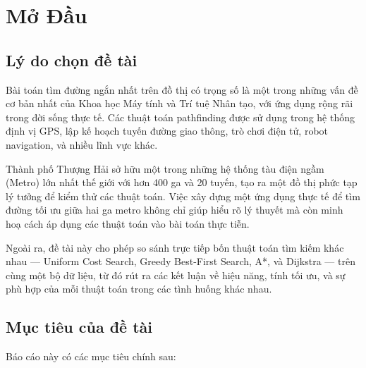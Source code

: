 
\chapter{Mở Đầu}

\section{Lý do chọn đề tài}

Bài toán tìm đường ngắn nhất trên đồ thị có trọng số là một trong những vấn đề cơ bản nhất của Khoa học Máy tính và Trí tuệ Nhân tạo, với ứng dụng rộng rãi trong đời sống thực tế. Các thuật toán pathfinding được sử dụng trong hệ thống định vị GPS, lập kế hoạch tuyến đường giao thông, trò chơi điện tử, robot navigation, và nhiều lĩnh vực khác.

Thành phố Thượng Hải sở hữu một trong những hệ thống tàu điện ngầm (Metro) lớn nhất thế giới với hơn 400 ga và 20 tuyến, tạo ra một đồ thị phức tạp lý tưởng để kiểm thử các thuật toán. Việc xây dựng một ứng dụng thực tế để tìm đường tối ưu giữa hai ga metro không chỉ giúp hiểu rõ lý thuyết mà còn minh hoạ cách áp dụng các thuật toán vào bài toán thực tiễn.

Ngoài ra, đề tài này cho phép so sánh trực tiếp bốn thuật toán tìm kiếm khác nhau --- Uniform Cost Search, Greedy Best-First Search, A*, và Dijkstra --- trên cùng một bộ dữ liệu, từ đó rút ra các kết luận về hiệu năng, tính tối ưu, và sự phù hợp của mỗi thuật toán trong các tình huống khác nhau.

\section{Mục tiêu của đề tài}

Báo cáo này có các mục tiêu chính sau:

